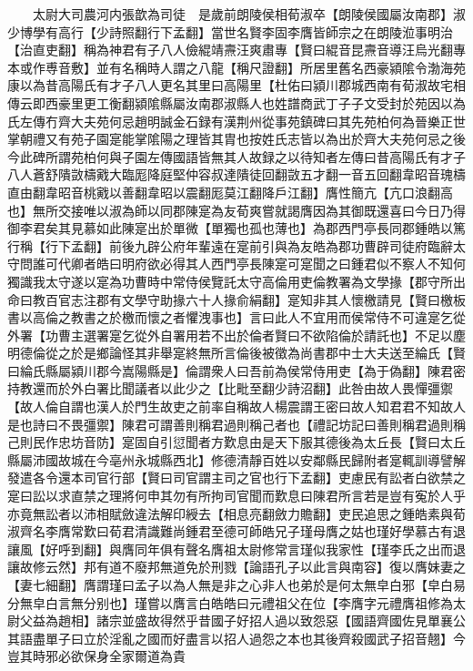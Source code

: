 　　太尉大司農河内張歆為司徒　是歲前朗陵侯相荀淑卒【朗陵侯國屬汝南郡】淑少博學有高行【少詩照翻行下孟翻】當世名賢李固李膺皆師宗之在朗陵涖事明治【治直吏翻】稱為神君有子八人儉緄靖燾汪爽肅專【賢曰緄音昆燾音導汪烏光翻專本或作尃音敷】並有名稱時人謂之八龍【稱尺證翻】所居里舊名西豪潁隂令渤海苑康以為昔高陽氏有才子八人更名其里曰高陽里【杜佑曰潁川郡城西南有荀淑故宅相傳云即西豪里更工衡翻潁隂縣屬汝南郡淑縣人也姓譜商武丁子子文受封於苑因以為氏左傳冇齊大夫苑何忌趙明誠金石録有漢荆州從事苑鎮碑曰其先苑柏何為晉樂正世掌朝禮又有苑子園寔能掌隂陽之理皆其胄也按姓氏志皆以為出於齊大夫苑何忌之後今此碑所謂苑柏何與子園左傳國語皆無其人故録之以待知者左傳曰昔高陽氏有才子八人蒼舒隤敳檮戭大臨厖降庭堅仲容叔達隤徒回翻敳五才翻一音五回翻韋昭音瑰檮直由翻韋昭音桃戭以善翻韋昭以震翻厖莫江翻降戶江翻】膺性簡亢【亢口浪翻高也】無所交接唯以淑為師以同郡陳寔為友荀爽嘗就謁膺因為其御既還喜曰今日乃得御李君矣其見慕如此陳寔出於單微【單獨也孤也薄也】為郡西門亭長同郡鍾皓以篤行稱【行下孟翻】前後九辟公府年輩遠在寔前引與為友皓為郡功曹辟司徒府臨辭太守問誰可代卿者皓曰明府欲必得其人西門亭長陳寔可寔聞之曰鍾君似不察人不知何獨識我太守遂以寔為功曹時中常侍侯覽託太守高倫用吏倫教署為文學掾【郡守所出命曰教百官志注郡有文學守助掾六十人掾俞絹翻】寔知非其人懷檄請見【賢曰檄板書以高倫之教書之於檄而懷之者懼洩事也】言曰此人不宜用而侯常侍不可違寔乞從外署【功曹主選署寔乞從外自署用若不出於倫者賢曰不欲陷倫於請託也】不足以塵明德倫從之於是鄉論怪其非舉寔終無所言倫後被徵為尚書郡中士大夫送至綸氏【賢曰綸氏縣屬潁川郡今嵩陽縣是】倫謂衆人曰吾前為侯常侍用吏【為于偽翻】陳君密持教還而於外白署比聞議者以此少之【比毗至翻少詩沼翻】此咎由故人畏憚彊禦【故人倫自謂也漢人於門生故吏之前率自稱故人楊震謂王密曰故人知君君不知故人是也詩曰不畏彊禦】陳君可謂善則稱君過則稱己者也【禮記坊記曰善則稱君過則稱己則民作忠坊音防】寔固自引愆聞者方歎息由是天下服其德後為太丘長【賢曰太丘縣屬沛國故城在今亳州永城縣西北】修德清靜百姓以安鄰縣民歸附者寔輒訓導譬解發遣各令還本司官行部【賢曰司官謂主司之官也行下孟翻】吏慮民有訟者白欲禁之寔曰訟以求直禁之理將何申其勿有所拘司官聞而歎息曰陳君所言若是豈有寃於人乎亦竟無訟者以沛相賦斂違法解印綬去【相息亮翻斂力贍翻】吏民追思之鍾皓素與荀淑齊名李膺常歎曰荀君清識難尚鍾君至德可師皓兄子瑾母膺之姑也瑾好學慕古有退讓風【好呼到翻】與膺同年俱有聲名膺祖太尉修常言瑾似我家性【瑾李氏之出而退讓故修云然】邦有道不廢邦無道免於刑戮【論語孔子以此言與南容】復以膺妹妻之【妻七細翻】膺謂瑾曰孟子以為人無是非之心非人也弟於是何太無皁白邪【皁白易分無皁白言無分别也】瑾嘗以膺言白皓皓曰元禮祖父在位【李膺字元禮膺祖修為太尉父益為趙相】諸宗並盛故得然乎昔國子好招人過以致怨惡【國語齊國佐見單襄公其語盡單子曰立於淫亂之國而好盡言以招人過怨之本也其後齊殺國武子招音翹】今豈其時邪必欲保身全家爾道為貴

